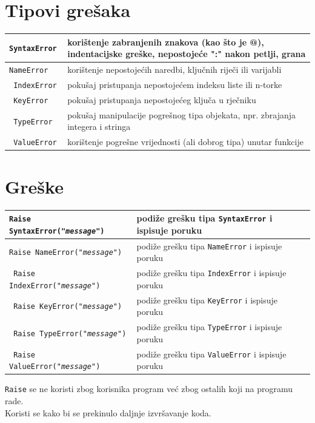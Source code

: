 \documentclass[10pt]{article}
\begin{document}
    \section*{\color{NavyBlue} Tipovi grešaka}
    \begin{tabular}{|>{\tt}p{9.00cm}|>{}p{15.50cm}|}
        \hline
        SyntaxError & korištenje zabranjenih znakova (kao što je @), indentacijske greške, nepostojeće ":" nakon petlji, grana
        \\ \hline
        NameError & korištenje nepostojećih naredbi, ključnih riječi ili varijabli
        \\ \hline
        IndexError & pokušaj pristupanja nepostojećem indeksu liste ili n-torke
        \\ \hline
        KeyError & pokušaj pristupanja nepostojećeg ključa u rječniku
        \\ \hline
        TypeError & pokušaj manipulacije pogrešnog tipa objekata, npr. zbrajanja integera i stringa
        \\ \hline
        ValueError & korištenje pogrešne vrijednosti (ali dobrog tipa) unutar funkcije
        \\ \hline
    \end{tabular}

    \section*{\color{NavyBlue} Greške}
    \begin{tabular}{|>{\tt}p{9.00cm}|>{}p{15.50cm}|}
        \hline
        Raise SyntaxError("\textit{message}") & podiže grešku tipa \texttt{SyntaxError} i ispisuje poruku
        \\ \hline
        Raise NameError("\textit{message}") & podiže grešku tipa \texttt{NameError} i ispisuje poruku
        \\ \hline
        Raise IndexError("\textit{message}") & podiže grešku tipa \texttt{IndexError} i ispisuje poruku
        \\ \hline
        Raise KeyError("\textit{message}") & podiže grešku tipa \texttt{KeyError} i ispisuje poruku
        \\ \hline
        Raise TypeError("\textit{message}") & podiže grešku tipa \texttt{TypeError} i ispisuje poruku
        \\ \hline
        Raise ValueError("\textit{message}") & podiže grešku tipa \texttt{ValueError} i ispisuje poruku
        \\ \hline
    \end{tabular}
    \begin{center}
        \texttt{Raise} se ne koristi zbog korisnika program već zbog ostalih koji na programu rade. \\
        Koristi se kako bi se prekinulo daljnje izvršavanje koda.
    \end{center}
\end{document}
